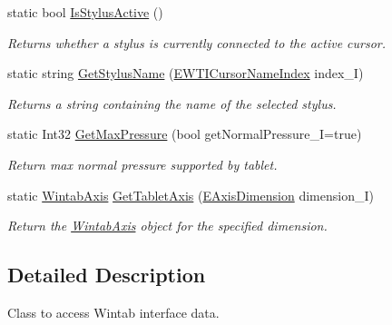 \begin{DoxyCompactItemize}
static bool \hyperlink{class_wintab_d_n_1_1_c_wintab_info_a239c82a9dfc1be06f7cd8487ff0f60f0}{IsStylusActive} ()
\begin{DoxyCompactList}\small\item\em Returns whether a stylus is currently connected to the active cursor. \item\end{DoxyCompactList}\item 
static string \hyperlink{class_wintab_d_n_1_1_c_wintab_info_a3481ff407b550197dbcd9764b87043b2}{GetStylusName} (\hyperlink{namespace_wintab_d_n_a54fdc0e52106effb073b35f8f6b3920a}{EWTICursorNameIndex} index\_\-I)
\begin{DoxyCompactList}\small\item\em Returns a string containing the name of the selected stylus. \item\end{DoxyCompactList}\item 
static Int32 \hyperlink{class_wintab_d_n_1_1_c_wintab_info_a45400b395e3a38548dc8bb41579e4428}{GetMaxPressure} (bool getNormalPressure\_\-I=true)
\begin{DoxyCompactList}\small\item\em Return max normal pressure supported by tablet. \item\end{DoxyCompactList}\item 
static \hyperlink{struct_wintab_d_n_1_1_wintab_axis}{WintabAxis} \hyperlink{class_wintab_d_n_1_1_c_wintab_info_ad6baf2c8073255192c3db7f2a63790b8}{GetTabletAxis} (\hyperlink{namespace_wintab_d_n_a38705aa38c49c04846399172fa9fd1cd}{EAxisDimension} dimension\_\-I)
\begin{DoxyCompactList}\small\item\em Return the \hyperlink{struct_wintab_d_n_1_1_wintab_axis}{WintabAxis} object for the specified dimension. \item\end{DoxyCompactList}\end{DoxyCompactItemize}


\subsection{Detailed Description}
Class to access Wintab interface data. 


